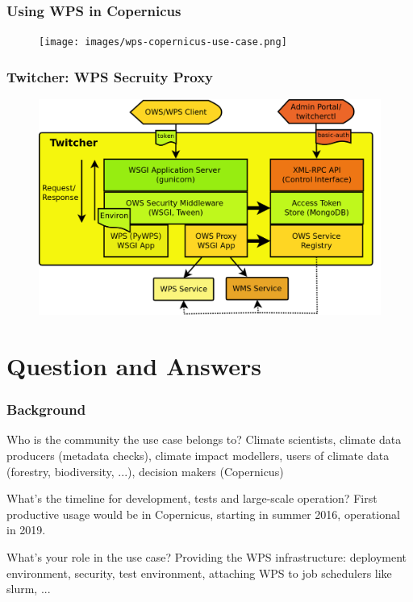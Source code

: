 \documentclass{beamer}
\begin{document}

  \begin{frame}[plain]
    \frametitle{Using WPS in Copernicus}
    \begin{figure}
      \texttt{[image: images/wps-copernicus-use-case.png]}
    \end{figure}
  \end{frame}


  \begin{frame}[plain]
    \frametitle{Twitcher: WPS Secruity Proxy}
    \begin{figure}
      \includegraphics[width=12cm]{images/twitcher-overview.png}
    \end{figure}
  \end{frame}


  \section{Question and Answers}

  \begin{frame}
    \frametitle{Background}
    \begin{block}{Who is the community the use case belongs to?}
      Climate scientists, climate data producers (metadata checks), climate impact modellers, users of climate data (forestry, biodiversity, ...), decision makers (Copernicus) 
    \end{block}
    \begin{block}{What's the timeline for development, tests and large-scale operation?}
      First productive usage would be in Copernicus, starting in summer 2016, operational in 2019. 
    \end{block}
    \begin{block}{What's your role in the use case?}
      Providing the WPS infrastructure: deployment environment, security, test environment, attaching WPS to job schedulers like slurm, ... 
    \end{block}
  \end{frame}
\end{document}
